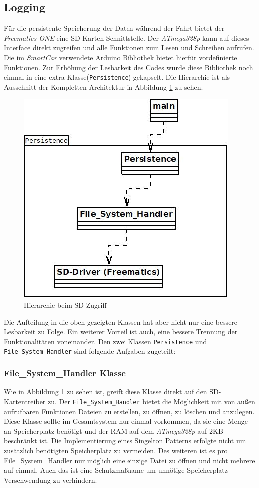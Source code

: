 \subsection{Logging}
\label{sec:Logging}
Für die persistente Speicherung der Daten während der Fahrt bietet der \textit{Freematics ONE} eine SD-Karten Schnittstelle. Der \textit{ATmega328p} kann auf dieses Interface direkt zugreifen und alle Funktionen zum Lesen und Schreiben aufrufen. Die im \textit{SmartCar} verwendete Arduino Bibliothek bietet hierfür vordefinierte Funktionen. Zur Erhöhung der Lesbarkeit des Codes wurde diese Bibliothek noch einmal in eine extra Klasse(\texttt{Persistence}) gekapselt. Die Hierarchie ist als Ausschnitt der Kompletten Architektur in Abbildung \ref{fig:Persistence} zu sehen. 
\begin{figure}[H]
  \begin{center}
    \includegraphics[scale=0.75]{./img/Persistence.jpg}
    \caption{Hierarchie beim SD Zugriff}
    \label{fig:Persistence}
  \end{center}
\end{figure}
Die Aufteilung in die oben gezeigten Klassen hat aber nicht nur eine bessere Lesbarkeit zu Folge. Ein weiterer Vorteil ist auch, eine bessere Trennung der Funktionalitäten voneinander. Den zwei Klassen \texttt{Persistence} und \texttt{File\_System\_Handler} sind folgende Aufgaben zugeteilt:\pagebreak
\subsubsection*{File\_System\_Handler Klasse}
Wie in Abbildung \ref{fig:Persistence} zu sehen ist, greift diese Klasse direkt auf den SD-Kartentreiber zu. Der \texttt{File\_System\_Handler} bietet die Möglichkeit mit von außen aufrufbaren Funktionen Dateien zu erstellen, zu öffnen, zu löschen und anzulegen. Diese Klasse sollte im Gesamtsystem nur einmal vorkommen, da sie eine Menge an Speicherplatz benötigt und der RAM auf dem \textit{ATmega328p} auf 2KB beschränkt ist.\cite{Atmega328P} Die Implementierung eines Singelton Patterns erfolgte nicht um zusätzlich benötigten Speicherplatz zu vermeiden.
Des weiteren ist es pro File\_System\_Handler nur möglich eine einzige Datei zu öffnen und nicht mehrere auf einmal. Auch das ist eine Schutzmaßname um unnötige Speicherplatz Verschwendung zu verhindern.
